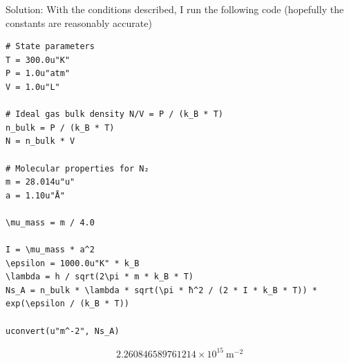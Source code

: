 \begin{homeworkProblem}
\begin{callout}{Solution:}
With the conditions described, I run the following code (hopefully the constants are reasonably accurate)
\begin{verbatim}
# State parameters
T = 300.0u"K"
P = 1.0u"atm"
V = 1.0u"L"

# Ideal gas bulk density N/V = P / (k_B * T)
n_bulk = P / (k_B * T)
N = n_bulk * V

# Molecular properties for N₂
m = 28.014u"u"
a = 1.10u"Å"

\mu_mass = m / 4.0

I = \mu_mass * a^2
\epsilon = 1000.0u"K" * k_B
\lambda = h / sqrt(2\pi * m * k_B * T)
Ns_A = n_bulk * \lambda * sqrt(\pi * ħ^2 / (2 * I * k_B * T)) * exp(\epsilon / (k_B * T))

uconvert(u"m^-2", Ns_A)
\end{verbatim}

$$ 2.260846589761214\times10^{15} \mathrm{~m^{-2}} $$

\end{callout}

\end{homeworkProblem}

